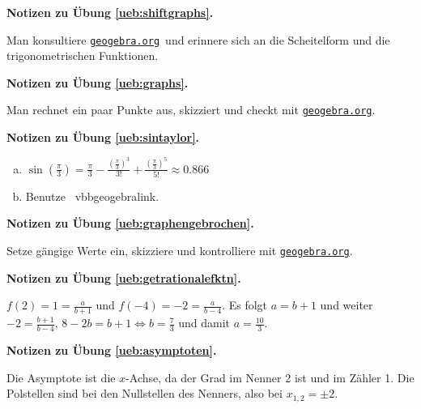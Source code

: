 \documentclass[%
11pt,%
twoside,%
titlepage,%
german,%
headsepline%
]{scrartcl}
\newcommand{\geogebralink}{\href{https://www.geogebra.org/calculator}{\texttt{geogebra.org}}}
\newcommand{\concatueb}[1]{ueb:#1}%
\newcommand{\concatlsg}[1]{lsg:#1}%
\newenvironment{lsg}[1]{%
    \par\noindent\textbf{Notizen zu Übung \ref{\concatueb{#1}}.}%
    \label{\concatlsg{#1}}
}{%
    \par%
}
\begin{document}
\begin{lsg}{shiftgraphs}
    Man konsultiere \geogebralink\ und erinnere sich an die Scheitelform und die trigonometrischen Funktionen.
\end{lsg}
\begin{lsg}{graphs}
    Man rechnet ein paar Punkte aus, skizziert und checkt mit \geogebralink.
\end{lsg}
\begin{lsg}{sintaylor}
    \begin{enumerate}[a)]
        \item $\sin(\tfrac{\pi}{3})=\tfrac{\pi}{3}-\frac{(\tfrac{\pi}{3})^3}{3!}+\frac{(\tfrac{\pi}{3})^5}{5!}\approx 0.866$
        \item Benutze \ vbbgeogebralink.
    \end{enumerate}
\end{lsg}
\begin{lsg}{graphengebrochen}
    Setze gängige Werte ein, skizziere und kontrolliere mit \geogebralink.
\end{lsg}
\begin{lsg}{getrationalefktn}
$f(2)=1=\frac{a}{b+1}$ und $f(-4)=-2=\frac{a}{b-4}$. Es folgt $a=b+1$ und weiter $-2=\frac{b+1}{b-4}$, $8-2b=b+1\Leftrightarrow b=\frac{7}{3}$ und damit $a=\frac{10}{3}$.
\end{lsg}
\begin{lsg}{asymptoten}
    Die Asymptote ist die $x$-Achse, da der Grad im Nenner 2 ist und im Zähler 1. Die Polstellen sind bei den Nullstellen des Nenners, also bei $x_{1,2}=\pm2$.
\end{lsg}

\clearpage

\listoffigures
%
%
\end{document}
